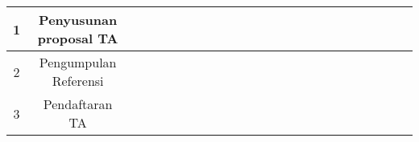 \begin{table}[h]
{\begin{tabular}{|c|c|l|l|l|l|l|l|l|l|l|l|l|l|l|l|l|l|l|l|l|l|l|l|}
			\hline
			1                   & Penyusunan proposal TA                                                     & {\cellcolor[rgb]{0.502,0.502,0.502}} & {\cellcolor[rgb]{0.502,0.502,0.502}} &                                      &                                      &                                      &                                      &                                      &                                      &                                      &                                      &                                      &                                      &                                      &                                      &                                      &                                      &                                      &                                      &                                      &                                      &                                      &                                       \\ 
			\hline
			2                   & Pengumpulan Referensi                                                      & {\cellcolor[rgb]{0.502,0.502,0.502}} & {\cellcolor[rgb]{0.502,0.502,0.502}} &                                      &                                      &                                      &                                      &                                      &                                      &                                      &                                      &                                      &                                      &                                      &                                      &                                      &                                      &                                      &                                      &                                      &                                      &                                      &                                       \\ 
			\hline
			3                   & Pendaftaran TA                                                             &                                      & {\cellcolor[rgb]{0.502,0.502,0.502}} &                                      &                                      &                                      &                                      &                                      &                                      &                                      &                                      &                                      &                                      &                                      &                                      &                                      &                                      &                                      &                                      &                                      &                                      &                                      &                                       \\ 

\end{tabular}}
\end{table}
